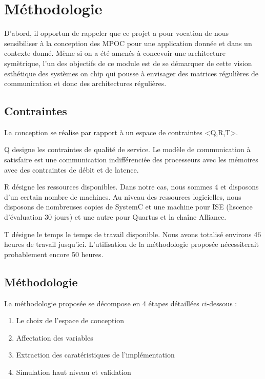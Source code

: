\documentclass[11pt]{article}
\begin{document}
\section{Méthodologie}

D'abord, il opportun de rappeler que ce projet a pour vocation de nous sensibiliser à la conception des MPOC pour une application donnée et dans un contexte donné. Mème si on a été amenés à concevoir une architecture symètrique, l'un des objectifs de ce module est de se démarquer de cette vision esthétique des systèmes on chip qui pousse à envisager des matrices régulières de communication et donc des architectures régulières.  

\subsection{Contraintes}

La conception se réalise par rapport à un espace de contraintes <Q,R,T>. 

Q designe les contraintes de qualité de service. Le modèle de communication à satisfaire est une communication indifférenciée des processeurs avec les mémoires avec des contraintes de débit et de latence.

R désigne les ressources disponibles. Dans notre cas, nous sommes 4 et disposons d'un certain nombre de machines. Au niveau des ressources logicielles, nous disposons de nombreuses copies de SystemC et une machine pour ISE (liscence d'évaluation 30 jours) et une autre pour Quartus et la chaîne Alliance.

T désigne le temps le temps de travail disponible. Nous avons totalisé environs 46 heures de travail jusqu'ici. L'utilisation de la méthodologie proposée nécessiterait probablement encore 50 heures.

\subsection{Méthodologie}

La méthodologie proposée se décompose en 4 étapes détaillées ci-dessous :
\begin{enumerate}
\item Le choix de l'espace de conception
\item Affectation des variables
\item Extraction des caratéristiques de l'implémentation
\item Simulation haut niveau et validation
\end{enumerate}
 
\end{document}
